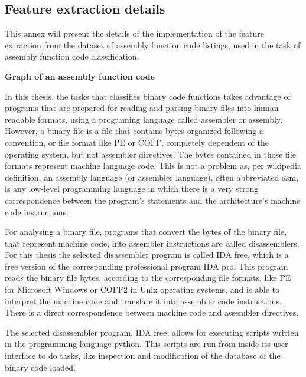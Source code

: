 \begin{appendices}
\section{Feature extraction details}\label{annex:graph_from_code}


This annex will present the details of the implementation of the feature extraction from the dataset of assembly function code listings, used in the task of assembly function code classification.

\textbf{Graph of an assembly function code}

In this thesis, the tasks that classifies binary code functions takes advantage of programs that are prepared for reading and parsing binary files into human readable formats, using a programing language called assembler or assembly. However, a binary file is a file that contains bytes organized following a convention, or file format like PE or COFF, completely dependent of the operating system, but not assembler directives. The bytes contained in those file formats represent machine language code. This is not a problem as, per wikipedia definition, an assembly language (or assembler language), often abbreviated asm, is any low-level programming language in which there is a very strong correspondence between the program's statements and the architecture's machine code instructions. 


For analysing a binary file, programs that convert the bytes of the binary file, that represent machine code, into assembler instructions are called disassemblers. For this thesis the selected disassembler program is called IDA free, which is a free version of the corresponding professional program IDA pro. This program reads the binary file bytes, according to the corresponding file formats, like PE for Microsoft Windows or COFF2 in Unix operating systems, and is able to interpret the machine code and translate it into assembler code instructions. There is a direct correspondence between machine code and assembler directives.

The selected disassembler program, IDA free, allows for executing scripts written in the programming language python. This scripts are run from inside its user interface to do tasks, like inspection and modification of the database of the binary code loaded.


\end{appendices}
